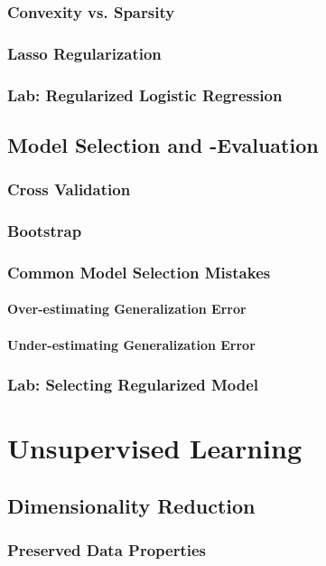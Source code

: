 \documentclass[11pt,fleqn]{book} %
\begin{document}
            \subsection{Convexity vs. Sparsity}
            \subsection{Lasso Regularization}
        \subsection{Lab: Regularized Logistic Regression}
    
    \section{Model Selection and -Evaluation}
        \subsection{Cross Validation}
        \subsection{Bootstrap}
        \subsection{Common Model Selection Mistakes}
            \subsubsection{Over-estimating Generalization Error}
            \subsubsection{Under-estimating Generalization Error}
    \subsection{Lab: Selecting Regularized Model}
        
\chapter{Unsupervised Learning}
    \section{Dimensionality Reduction}
        \subsection{Preserved Data Properties}
\end{document}
